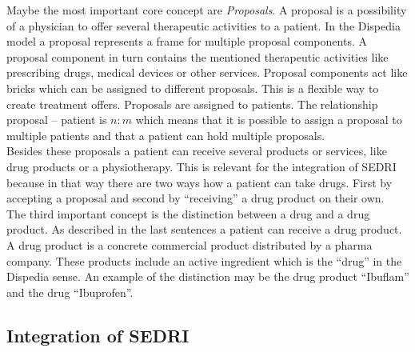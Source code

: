 Maybe the most important core concept are \textit{Proposals}.
A proposal is a possibility of a physician to offer several therapeutic activities to a patient.
In the Dispedia model a proposal represents a frame for multiple proposal components.
A proposal component in turn contains the mentioned therapeutic activities like prescribing drugs, medical devices or other services.
Proposal components act like bricks which can be assigned to different proposals.
This is a flexible way to create treatment offers.
Proposals are assigned to patients.
The relationship proposal -- patient is $n:m$ which means that it is possible to assign a proposal to multiple patients and that a patient can hold multiple proposals.\\
Besides these proposals a patient can receive several products or services, like drug products or a physiotherapy.
This is relevant for the integration of SEDRI because in that way there are two ways how a patient can take drugs.
First by accepting a proposal and second by ``receiving'' a drug product on their own.\\
The third important concept is the distinction between a drug and a drug product.
As described in the last sentences a patient can receive a drug product.
A drug product is a concrete commercial product distributed by a pharma company.
These products include an active ingredient which is the ``drug'' in the Dispedia sense.
An example of the distinction may be the drug product ``Ibuflam'' and the drug ``Ibuprofen''.

\subsection{Integration of SEDRI}
\label{sec:integration-sedri}

